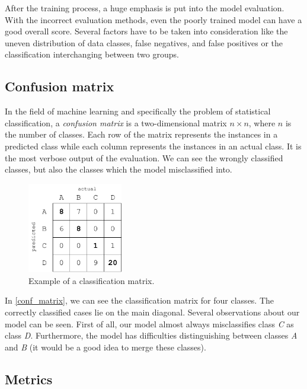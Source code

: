 After the training process, a huge emphasis is put into the model evaluation. With the incorrect evaluation methods, even the poorly trained model can have a good overall score. Several factors have to be taken into consideration like the uneven distribution of data classes, false negatives, and false positives or the classification interchanging between two groups.

\subsection{Confusion matrix}

In the field of machine learning and specifically the problem of statistical classification, a \textit{confusion matrix}\cite{conf_matrix} is a two-dimensional matrix $n \times n$, where $n$ is the number of classes. Each row of the matrix represents the instances in a predicted class while each column represents the instances in an actual class. It is the most verbose output of the evaluation. We can see the wrongly classified classes, but also the classes which the model misclassified into. 

\begin{figure}[h]
\centering
\includegraphics[width=0.37\textwidth]{tex/images/conf_matrix}
\caption{Example of a classification matrix.}
\label{conf_matrix}
\end{figure}

\noindent
In \autoref{conf_matrix}, we can see the classification matrix for four classes. The correctly classified cases lie on the main diagonal. Several observations about our model can be seen. First of all, our model almost always misclassifies class \textit{C} as class \textit{D}. Furthermore, the model has difficulties distinguishing between classes \textit{A} and \textit{B} (it would be a good idea to merge these classes).

\subsection{Metrics}


